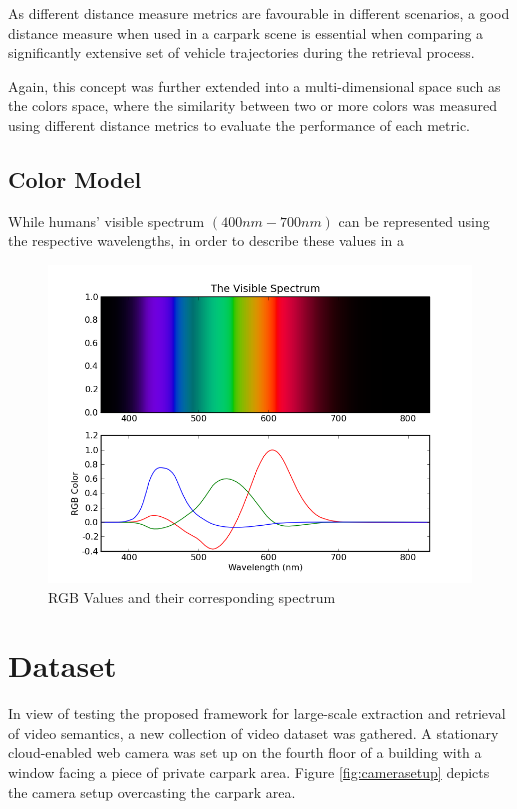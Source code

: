 As different distance measure metrics are favourable in different scenarios, a good distance measure when used in a carpark scene is essential when comparing a significantly extensive set of vehicle trajectories during the retrieval process.   

Again, this concept was further extended into a multi-dimensional space such as the colors space, where the similarity between two or more colors was measured using different distance metrics to evaluate the performance of each metric. 



\subsection{Color Model}

While humans' visible spectrum $(400nm - 700nm)$ can be represented using the respective wavelengths,  in order to describe these values in a 


\begin{figure}[hbt!]\centering
\includegraphics[width=.7\textwidth]{image/general/VisibleSpectrum.png}
\caption{RGB Values and their corresponding spectrum}
\label{fig:visibleSpectrum}
\end{figure}





\section{Dataset}
\label{section:dataset_used}

In view of testing the proposed framework for large-scale extraction and retrieval of video semantics, a new collection of video dataset was gathered. A stationary cloud-enabled web camera was set up on the fourth floor of a building with a window facing a piece of private carpark area. Figure \ref{fig:camerasetup} depicts the camera setup overcasting the carpark area. 

